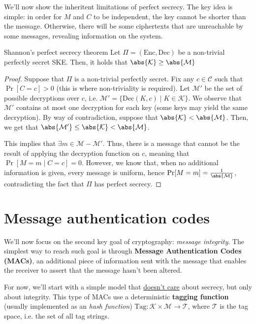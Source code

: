 \documentclass[a4paper, 12pt]{report}
\begin{document}
    We'll now show the inheritent limitations of perfect secrecy. The key idea is simple: in order for $M$ and $C$ to be independent, the key cannot be shorter than the message. Otherwise, there will be some ciphertexts that are unreachable by some messages, revealing information on the system.

    \begin{framedthm}{Shannon's perfect secrecy theorem}
        Let $\Pi = (\mathrm{Enc}, \mathrm{Dec})$ be a non-trivial perfectly secret SKE. Then, it holds that $\abs{\mathcal{K}} \geq \abs{\mathcal{M}}$
    \end{framedthm}

    \begin{proof}
        Suppose that $\Pi$ is a non-trivial perfectly secret. Fix any $c \in \mathcal{C}$ such that $\Pr[C = c] > 0$ (this is where non-triviality is required). Let $\mathcal{M}'$ be the set of possible decryptions over $c$, i.e. $\mathcal{M}' = \{\mathrm{Dec}(K,c) \mid K \in \mathcal{K}\}$. We observe that $\mathcal{M}'$ contains at most one decryption for each key (some keys may yield the same decryption). By way of contradiction, suppose that $\abs{\mathcal{K}} < \abs{\mathcal{M}}$. Then, we get that $\abs{\mathcal{M}'} \leq \abs{\mathcal{K}} < \abs{\mathcal{M}}$.

        This implies that $\exists m \in \mathcal{M} - \mathcal{M}'$. Thus, there is a message that cannot be the result of applying the decryption function on $c$, meaning that $\Pr[M = m \mid C = c] = 0$. However, we know that, when no additional information is given, every message is uniform, hence $\Pr[M = m] = \frac{1}{\abs{\mathcal{M}}}$, contradicting the fact that $\Pi$ has perfect secrecy.
    \end{proof}

    \section{Message authentication codes}

    We'll now focus on the second key goal of cryptography: \textit{message integrity}. The simplest way to reach such goal is through \textbf{Message Authentication Codes (MACs)}, an additional piece of information sent with the message that enables the receiver to assert that the message hasn't been altered.
    
    For now, we'll start with a simple model that \underline{doesn't care} about secrecy, but only about integrity. This type of MACs use a deterministic \textbf{tagging function} (usually implemented as an \textit{hash function}) $\mathrm{Tag} : \mathcal{K} \times \mathcal{M} \to \mathcal{T}$, where $\mathcal{T}$ is the tag space, i.e. the set of all tag strings.
\end{document}
